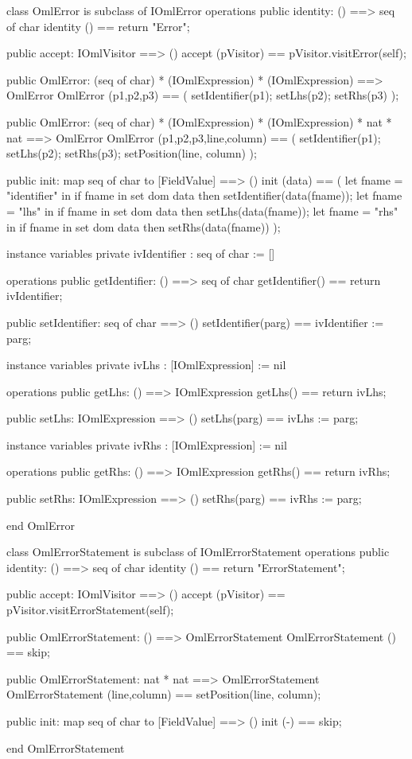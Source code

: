 \begin{vdm_al}
class OmlError is subclass of IOmlError
operations
  public identity: () ==> seq of char
  identity () == return "Error";

  public accept: IOmlVisitor ==> ()
  accept (pVisitor) == pVisitor.visitError(self);

  public OmlError:
    (seq of char) *
    (IOmlExpression) *
    (IOmlExpression) ==> OmlError
  OmlError (p1,p2,p3) == 
    ( setIdentifier(p1);
      setLhs(p2);
      setRhs(p3) );

  public OmlError:
    (seq of char) *
    (IOmlExpression) *
    (IOmlExpression) *
    nat *
    nat ==> OmlError
  OmlError (p1,p2,p3,line,column) == 
    ( setIdentifier(p1);
      setLhs(p2);
      setRhs(p3);
      setPosition(line, column) );

  public init: map seq of char to [FieldValue] ==> ()
  init (data) ==
    ( let fname = "identifier" in
        if fname in set dom data
        then setIdentifier(data(fname));
      let fname = "lhs" in
        if fname in set dom data
        then setLhs(data(fname));
      let fname = "rhs" in
        if fname in set dom data
        then setRhs(data(fname)) );

instance variables
  private ivIdentifier : seq of char := []

operations
  public getIdentifier: () ==> seq of char
  getIdentifier() == return ivIdentifier;

  public setIdentifier: seq of char ==> ()
  setIdentifier(parg) == ivIdentifier := parg;

instance variables
  private ivLhs : [IOmlExpression] := nil

operations
  public getLhs: () ==> IOmlExpression
  getLhs() == return ivLhs;

  public setLhs: IOmlExpression ==> ()
  setLhs(parg) == ivLhs := parg;

instance variables
  private ivRhs : [IOmlExpression] := nil

operations
  public getRhs: () ==> IOmlExpression
  getRhs() == return ivRhs;

  public setRhs: IOmlExpression ==> ()
  setRhs(parg) == ivRhs := parg;

end OmlError
\end{vdm_al}

\begin{vdm_al}
class OmlErrorStatement is subclass of IOmlErrorStatement
operations
  public identity: () ==> seq of char
  identity () == return "ErrorStatement";

  public accept: IOmlVisitor ==> ()
  accept (pVisitor) == pVisitor.visitErrorStatement(self);

  public OmlErrorStatement:
    () ==> OmlErrorStatement
  OmlErrorStatement () == 
    skip;

  public OmlErrorStatement:
    nat *
    nat ==> OmlErrorStatement
  OmlErrorStatement (line,column) == 
    setPosition(line, column);

  public init: map seq of char to [FieldValue] ==> ()
  init (-) == skip;

end OmlErrorStatement
\end{vdm_al}

